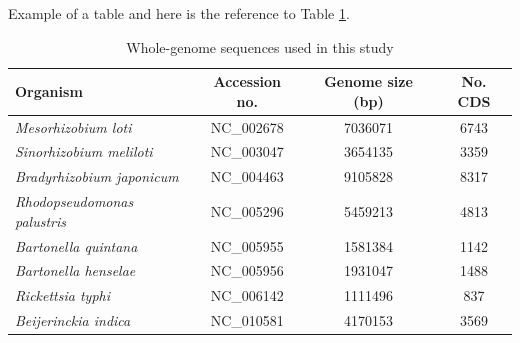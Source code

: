 Example of a table and here is the reference to Table \ref{table_genomes}. 

\begin{table}
\begin{center}
\begin{tabular}{|l|c|c|c|}
\hline
{\sc Organism}  &  {\sc Accession no.}  & {\sc Genome size} (bp)  & {\sc No. CDS} \\
\hline
{\it Mesorhizobium loti}          & NC\_002678 & 7036071 & 6743 \\
\hline
{\it Sinorhizobium meliloti}      & NC\_003047 & 3654135 & 3359 \\
\hline
{\it Bradyrhizobium japonicum}    & NC\_004463 & 9105828 & 8317 \\
\hline
{\it Rhodopseudomonas palustris}  & NC\_005296 & 5459213 & 4813 \\
\hline
{\it Bartonella quintana}         & NC\_005955 & 1581384 & 1142 \\
\hline
{\it Bartonella henselae}         & NC\_005956 & 1931047 & 1488 \\
\hline
{\it Rickettsia typhi}            & NC\_006142 & 1111496 & 837 \\
\hline
{\it Beijerinckia indica}         & NC\_010581 & 4170153 & 3569 \\
\hline
\end{tabular}
\end{center}
\caption{Whole-genome sequences used in this study}
\label{table_genomes}
\end{table}


